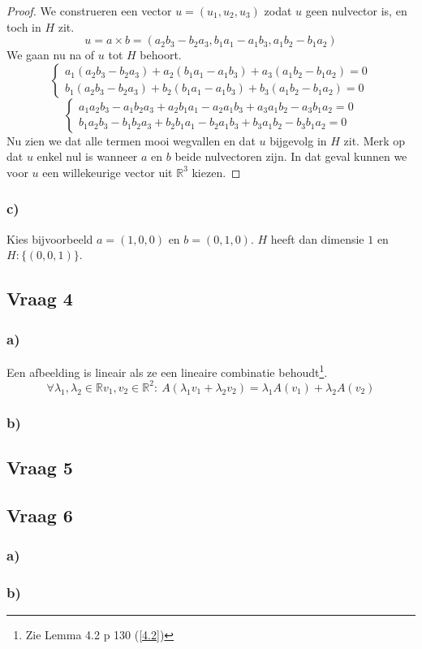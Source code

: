 \documentclass[lineaire_algebra_oplossingen.tex]{subfiles}
\begin{document}
\begin{proof}
We construeren een vector $u = (u_1,u_2,u_3)$ zodat $u$ geen nulvector is, en toch in $H$ zit.
\[
u = a \times b =
(a_2b_3-b_2a_3, b_1a_1-a_1b_3, a_1b_2-b_1a_2)
\]
We gaan nu na of $u$ tot $H$ behoort.
\[
\left\{
\begin{array}{c}
a_1(a_2b_3-b_2a_3) + a_2(b_1a_1-a_1b_3) + a_3(a_1b_2-b_1a_2) = 0\\
b_1(a_2b_3-b_2a_3) + b_2(b_1a_1-a_1b_3) + b_3(a_1b_2-b_1a_2) = 0
\end{array}
\right.
\]
\[
\left\{
\begin{array}{c}
a_1a_2b_3-a_1b_2a_3 + a_2b_1a_1-a_2a_1b_3 + a_3a_1b_2-a_3b_1a_2 = 0\\
b_1a_2b_3-b_1b_2a_3 + b_2b_1a_1-b_2a_1b_3 + b_3a_1b_2-b_3b_1a_2 = 0
\end{array}
\right.
\]
Nu zien we dat alle termen mooi wegvallen en dat $u$ bijgevolg in $H$ zit. Merk op dat $u$ enkel nul is wanneer $a$ en $b$ beide nulvectoren zijn. In dat geval kunnen we voor $u$ een willekeurige vector uit $\mathbb{R}^3$ kiezen.
\end{proof}

\subsubsection*{c)}
Kies bijvoorbeeld $a= (1,0,0)$ en $b=(0,1,0)$. $H$ heeft dan dimensie $1$ en $H : \{(0,0,1)\}$.

\subsection{Vraag 4}
\subsubsection*{a)}
Een afbeelding is lineair als ze een lineaire combinatie behoudt\footnote{Zie Lemma 4.2 p 130 (\ref{4.2})}.
\[
\forall \lambda_1,\lambda_2 \in \mathbb{R} v_1,v_2 \in \mathbb{R}^{2}:\  A(\lambda_1v_1+\lambda_2v_2) = \lambda_1A(v_1)+\lambda_2A(v_2)
\]

\subsubsection*{b)}

\subsection{Vraag 5}

\subsection{Vraag 6}
\subsubsection*{a)}


\subsubsection*{b)}
\end{document}
